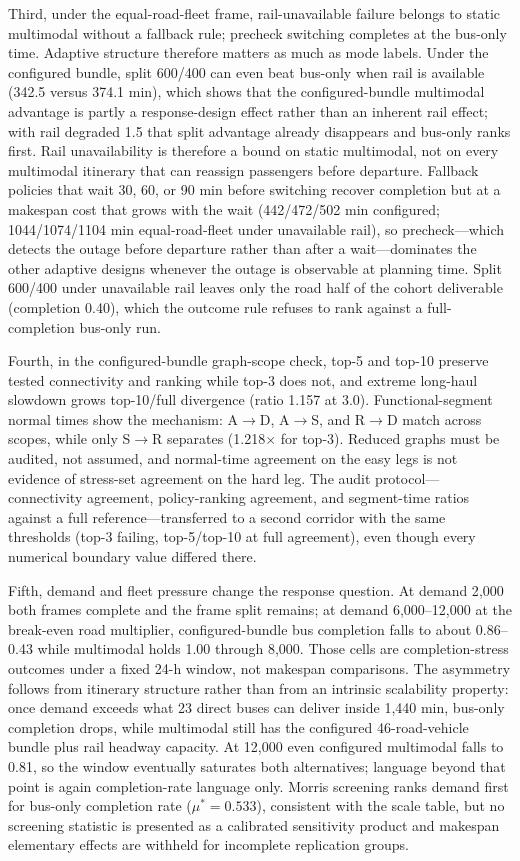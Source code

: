 \documentclass{ieeeaccess}
\begin{document}
Third, under the equal-road-fleet frame, rail-unavailable failure belongs to static multimodal without a fallback rule; precheck switching completes at the bus-only time. Adaptive structure therefore matters as much as mode labels. Under the configured bundle, split 600/400 can even beat bus-only when rail is available (342.5 versus 374.1 min), which shows that the configured-bundle multimodal advantage is partly a response-design effect rather than an inherent rail effect; with rail degraded 1.5 that split advantage already disappears and bus-only ranks first. Rail unavailability is therefore a bound on static multimodal, not on every multimodal itinerary that can reassign passengers before departure. Fallback policies that wait 30, 60, or 90 min before switching recover completion but at a makespan cost that grows with the wait (442/472/502 min configured; 1044/1074/1104 min equal-road-fleet under unavailable rail), so precheck---which detects the outage before departure rather than after a wait---dominates the other adaptive designs whenever the outage is observable at planning time. Split 600/400 under unavailable rail leaves only the road half of the cohort deliverable (completion 0.40), which the outcome rule refuses to rank against a full-completion bus-only run.

Fourth, in the configured-bundle graph-scope check, top-5 and top-10 preserve tested connectivity and ranking while top-3 does not, and extreme long-haul slowdown grows top-10/full divergence (ratio 1.157 at 3.0). Functional-segment normal times show the mechanism: A$\rightarrow$D, A$\rightarrow$S, and R$\rightarrow$D match across scopes, while only S$\rightarrow$R separates (1.218$\times$ for top-3). Reduced graphs must be audited, not assumed, and normal-time agreement on the easy legs is not evidence of stress-set agreement on the hard leg. The audit protocol---connectivity agreement, policy-ranking agreement, and segment-time ratios against a full reference---transferred to a second corridor with the same thresholds (top-3 failing, top-5/top-10 at full agreement), even though every numerical boundary value differed there.

Fifth, demand and fleet pressure change the response question. At demand 2{,}000 both frames complete and the frame split remains; at demand 6{,}000--12{,}000 at the break-even road multiplier, configured-bundle bus completion falls to about 0.86--0.43 while multimodal holds 1.00 through 8{,}000. Those cells are completion-stress outcomes under a fixed 24-h window, not makespan comparisons. The asymmetry follows from itinerary structure rather than from an intrinsic scalability property: once demand exceeds what 23 direct buses can deliver inside 1{,}440 min, bus-only completion drops, while multimodal still has the configured 46-road-vehicle bundle plus rail headway capacity. At 12{,}000 even configured multimodal falls to 0.81, so the window eventually saturates both alternatives; language beyond that point is again completion-rate language only. Morris screening ranks demand first for bus-only completion rate ($\mu^{*}=0.533$), consistent with the scale table, but no screening statistic is presented as a calibrated sensitivity product and makespan elementary effects are withheld for incomplete replication groups.
\end{document}
